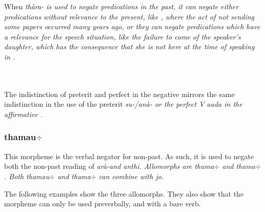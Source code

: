When \em thàra- \em is used to negate predications in the past, it can negate either predications without relevance to the present, like , where the act of not sending some papers occurred many years ago, or they can negate predications which have a relevance for the speech situation, like the failure to come of the speaker's daughter, which has the consequence that she is not here at the time of speaking in .

 \\
 \\
The indistinction of preterit and perfect in the negative mirrors the same indistinction in the use of the preterit \em su-/anà- \em or the perfect \em V aada \em in the affirmative .
 

\subsubsection{thamau$\div$}\label{sec:morph:thamau-}
This morpheme is the verbal negator for non-past. As such, it is used to negate both the non-past reading of  \em arà-\em and \em anthi\em. Allomorphs are \em thuma$\div$ \em and \em thama$\div$\em.   Both \em thamau$\div$ \em and \em thama$\div$ \em can combine with \em jo\em.

% 
% 
% 
The following examples show the three allomorphs. They also show that
the morpheme can only be used preverbally, and  with a bare verb.


 \\

